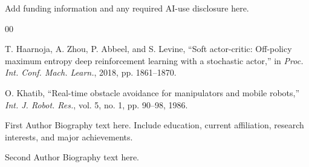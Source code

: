 \documentclass{ieeeaccess}
\begin{document}
Add funding information and any required AI-use disclosure here.

\begin{thebibliography}{00}

T. Haarnoja, A. Zhou, P. Abbeel, and S. Levine, ``Soft actor-critic: Off-policy maximum entropy deep reinforcement learning with a stochastic actor,'' in \emph{Proc. Int. Conf. Mach. Learn.}, 2018, pp. 1861--1870.

O. Khatib, ``Real-time obstacle avoidance for manipulators and mobile robots,'' \emph{Int. J. Robot. Res.}, vol. 5, no. 1, pp. 90--98, 1986.

\end{thebibliography}

\begin{IEEEbiography}{First Author}
Biography text here. Include education, current affiliation, research interests, and major achievements.
\end{IEEEbiography}

\begin{IEEEbiography}{Second Author}
Biography text here.
\end{IEEEbiography}

\EOD
\end{document}
